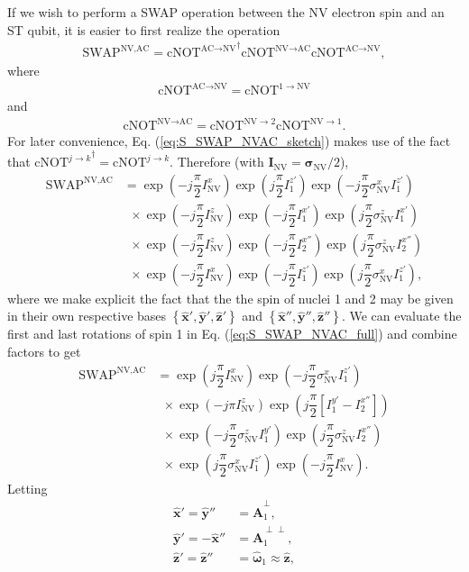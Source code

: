 \documentclass[twocolumn]{revtex4-1}
\renewcommand{\t}{\text} %
\newcommand{\f}[2]{\dfrac{#1}{#2}} %
\newcommand{\p}[1]{\left(#1\right)} %
\renewcommand{\sp}[1]{\left[#1\right]} %
\renewcommand{\set}[1]{\left\{#1\right\}} %
\renewcommand{\v}{\bm} %
\newcommand{\uv}[1]{\hat{\v{#1}}} %
\newcommand{\SWAP}{\t{SWAP}}
\newcommand{\cNOT}{\t{cNOT}}
\newcommand{\NV}{\t{NV}}
\newcommand{\AC}{\t{AC}}
\begin{document}
If we wish to perform a SWAP operation between the NV electron spin
and an ST qubit, it is easier to first realize the operation
\begin{align}
  \SWAP^{\NV,\AC}
  = {\cNOT^{\AC\to\NV}}^\dagger\cNOT^{\NV\to\AC}\cNOT^{\AC\to\NV},
  \label{eq:S_SWAP_NVAC_sketch}
\end{align}
where
\begin{align}
  \cNOT^{\AC\to\NV} = \cNOT^{1\to\NV}
\end{align}
and
\begin{align}
  \cNOT^{\NV\to\AC} = \cNOT^{\NV\to2}\cNOT^{\NV\to1}.
\end{align}
For later convenience, Eq. (\ref{eq:S_SWAP_NVAC_sketch}) makes use of
the fact that ${\cNOT^{j\to k}}^\dagger=\cNOT^{j\to k}$. Therefore
(with $\v I_\NV=\v\sigma_\NV/2$),
\begin{align}
  \SWAP^{\NV,\AC}
  &= \exp\p{-j\f\pi2 I_\NV^x} \exp\p{j\f\pi2 I_1^{z'}}
    \exp\p{-j\f\pi2 \sigma_\NV^x I_1^{z'}} \tag*{} \\
  &~~\times \exp\p{-j\f\pi2 I_\NV^z} \exp\p{-j\f\pi2 I_1^{x'}}
    \exp\p{j\f\pi2 \sigma_\NV^z I_1^{x'}} \tag*{} \\
  &~~\times \exp\p{-j\f\pi2 I_\NV^z} \exp\p{-j\f\pi2 I_2^{x''}}
    \exp\p{j\f\pi2 \sigma_\NV^z I_2^{x''}} \tag*{} \\
  &~~\times \exp\p{-j\f\pi2 I_\NV^x} \exp\p{-j\f\pi2 I_1^{z'}}
    \exp\p{j\f\pi2 \sigma_\NV^x I_1^{z'}},
    \label{eq:S_SWAP_NVAC_full}
\end{align}
where we make explicit the fact that the the spin of nuclei 1 and 2
may be given in their own respective bases
$\set{\uv x',\uv y',\uv z'}$ and $\set{\uv x'',\uv y'',\uv z''}$. We
can evaluate the first and last rotations of spin 1 in
Eq. (\ref{eq:S_SWAP_NVAC_full}) and combine factors to get
\begin{align}
  \SWAP^{\NV,\AC}
  &= \exp\p{j\f\pi2 I_\NV^x} \exp\p{-j\f\pi2 \sigma_\NV^x I_1^{z'}}
    \tag*{} \\
  &~~\times \exp\p{-j\pi I_\NV^z} \exp\p{j\f\pi2\sp{I_1^{y'}-I_2^{x''}}}
    \tag*{} \\
  &~~\times \exp\p{-j\f\pi2 \sigma_\NV^z I_1^{y'}}
    \exp\p{j\f\pi2 \sigma_\NV^z I_2^{x''}} \tag*{} \\
  &~~\times \exp\p{j\f\pi2 \sigma_\NV^x I_1^{z'}}
    \exp\p{-j\f\pi2 I_\NV^x}.
\end{align}
Letting
\begin{align}
  \uv x' = \uv y'' &= \uv A_1^\perp, \\
  \uv y' = -\uv x'' &= \uv A_1^{\perp\perp}, \\
  \uv z' = \uv z'' &= \uv\omega_1\approx\uv z, \label{eq:S_w=z}
\end{align}
\end{document}
